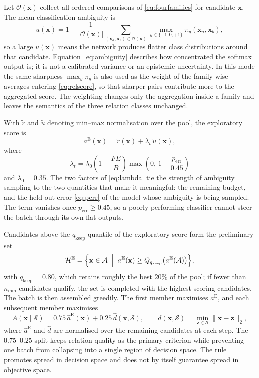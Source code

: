 \documentclass[11pt,a4paper]{article}
\newcommand{\vx}{\mathbf{x}}
\newcommand{\vz}{\mathbf{z}}
\begin{document}
Let $\mathcal{O}(\vx)$ collect all ordered comparisons of \eqref{eq:fourfamilies}
for candidate $\vx$. The mean classification ambiguity is
\begin{equation}
u(\vx)=1-\frac{1}{|\mathcal{O}(\vx)|}
\sum_{(\vx_a,\vx_b)\in\mathcal{O}(\vx)}
\max_{y\in\{-1,0,+1\}}\pi_y(\vx_a,\vx_b),
\label{eq:ambiguity}
\end{equation}
so a large $u(\vx)$ means the network produces flatter class distributions around
that candidate. Equation~\eqref{eq:ambiguity} describes how concentrated the
softmax output is; it is not a calibrated variance or an epistemic uncertainty.
In this mode the same sharpness $\max_y\pi_y$ is also used as the weight of the
family-wise averages entering \eqref{eq:relscore}, so that sharper pairs
contribute more to the aggregated score. The weighting changes only the
aggregation inside a family and leaves the semantics of the three relation
classes unchanged.

With $\widetilde r$ and $\widetilde u$ denoting min--max normalisation over the
pool, the exploratory score is
\begin{equation}
a^{\mathrm{E}}(\vx)=\widetilde r(\vx)+\lambda_t\,\widetilde u(\vx),
\label{eq:expscore}
\end{equation}
where
\begin{equation}
\lambda_t=\lambda_0\left(1-\frac{FE}{B}\right)
\max\!\left(0,\,1-\frac{p_{\mathrm{err}}}{0.45}\right)
\label{eq:lambda}
\end{equation}
and $\lambda_0=0.35$. The two factors of \eqref{eq:lambda} tie the strength of
ambiguity sampling to the two quantities that make it meaningful: the remaining
budget, and the held-out error \eqref{eq:perr} of the model whose ambiguity is
being sampled. The term vanishes once $p_{\mathrm{err}}\geq0.45$, so a poorly
performing classifier cannot steer the batch through its own flat outputs.

Candidates above the $q_{\mathrm{keep}}$ quantile of the exploratory score form
the preliminary set
\begin{equation}
\mathcal{H}^{\mathrm{E}}=\Bigl\{\vx\in\mathcal{A}\;\Bigm|\;
a^{\mathrm{E}}(\vx)\geq
Q_{q_{\mathrm{keep}}}\bigl(a^{\mathrm{E}}(\mathcal{A})\bigr)\Bigr\},
\label{eq:prefilter-exp}
\end{equation}
with $q_{\mathrm{keep}}=0.80$, which retains roughly the best $20\%$ of the pool;
if fewer than $n_{\min}$ candidates qualify, the set is completed with the
highest-scoring candidates. The batch is then assembled greedily. The first
member maximises $a^{\mathrm{E}}$, and each subsequent member maximises
\begin{equation}
A(\vx\mid\mathcal{S})
=0.75\,\widehat a^{\mathrm{E}}(\vx)+0.25\,\widehat d(\vx,\mathcal{S}),
\qquad
d(\vx,\mathcal{S})=\min_{\vz\in\mathcal{S}}\|\vx-\vz\|_2 ,
\label{eq:greedy}
\end{equation}
where $\widehat a^{\mathrm{E}}$ and $\widehat d$ are normalised over the
remaining candidates at each step. The $0.75$--$0.25$ split keeps relation
quality as the primary criterion while preventing one batch from collapsing into
a single region of decision space. The rule promotes spread in decision space and
does not by itself guarantee spread in objective space.
\end{document}
